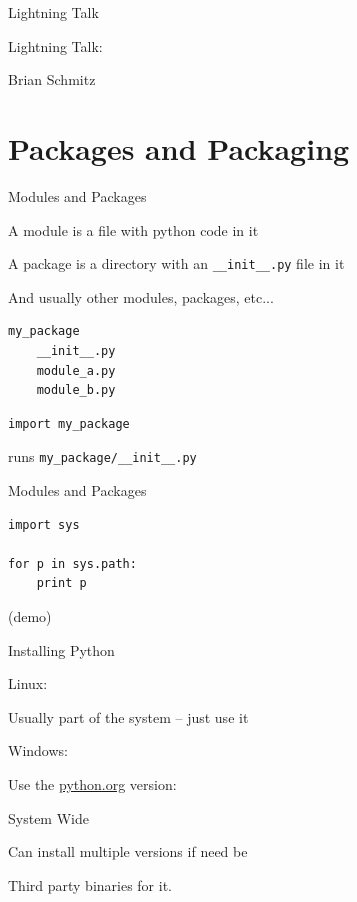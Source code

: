 \documentclass{beamer}
\begin{document}
\begin{frame}{Lightning Talk}

{\LARGE Lightning Talk:}

\vfill
{\large   Brian Schmitz}

\end{frame}


\section{Packages and Packaging}

\begin{frame}[fragile]{Modules and Packages}

\vfill
{\Large A module is a file with python code in it}

\vfill
{\Large A package is a directory with an \verb|__init__.py| file in it}

\vfill
{\Large And usually other modules, packages, etc...}

\begin{verbatim}
my_package
    __init__.py
    module_a.py
    module_b.py
\end{verbatim}

\begin{verbatim}
import my_package
\end{verbatim}

runs \verb|my_package/__init__.py|

\end{frame} 


\begin{frame}[fragile]{Modules and Packages}

\vfill
\begin{verbatim}
import sys

for p in sys.path:
    print p

\end{verbatim}

\vfill
(demo)
\end{frame} 

\begin{frame}[fragile]{Installing Python}

{\Large Linux:}

Usually part of the system -- just use it

\vfill
{\Large Windows:}

\vfill
Use the \url{python.org} version:

\vfill
System Wide

\vfill
Can install multiple versions if need be

\vfill
Third party binaries for it.

\end{frame} 
\end{document}
